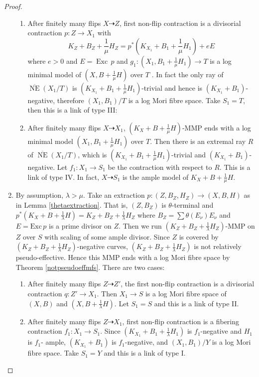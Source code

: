 \documentclass[11pt]{amsart}
\begin{document}
\begin{proof}
\begin{enumerate}
\begin{enumerate}
    \item \label{a3}
      After finitely many flips $ X\dashrightarrow Z $, first non-flip contraction is a divisorial contraction $ p:Z\to X_1$ with 
    \[ K_Z+B_Z+\frac{1}{\mu}H_Z=p^*(K_{X_1}+B_1+\frac{1}{\mu}H_1)+eE \]
    where $ e>0 $ and  $E=\operatorname{Exc}\,p$ and  $g_{1}: (X_1,B_1+\frac{1}{\mu}H_1) \to T$ is a log minimal model of $(X,B+\frac{1}{\mu}H)$ over $T$ . In fact the only ray of $ \overline{\operatorname{NE}}(X_1/T) $ is $ (K_{X_1}+B_1+\frac{1}{\mu}H_1) $-trivial and hence is $ (K_{X_1}+B_1) $-negative, therefore $ (X_1,B_1)/T $ is a log Mori fibre space. Take $ S_1=T $, then this is a link of type III:
  \item \label{a4}After finitely many flips $ X\dashrightarrow X_1 $, $(K_{X}+B+\frac{1}{\mu}H)$-MMP ends with a log minimal model $ (X_1,B_1+\frac{1}{\mu}H_1) $ over $T $. Then there is an extremal ray $R$ of $ \overline{\operatorname{NE}}(X_1/T) $, which is $ (K_{X_1}+B_1+\frac{1}{\mu}H_1) $-trivial and $ (K_{X_1}+B_1) $-negative. Let $ f_1:X_1\to S_1 $ be the contraction with respect to $R$. This is a link of type IV. In fact, $X \dashrightarrow  S_{1}$ is the ample model of $K_{X}+B+\frac{1}{\mu}H$.
  \end{enumerate}
\item\label{b}By assumption, $\lambda>\mu$. Take  an extraction $ p:(Z,B_Z,H_Z)\to (X,B,H) $ as in Lemma \ref{thetaextraction}. That is,  $ (Z,B_Z) $ is $ \theta $-terminal and $ p^*(K_X+B+\frac{1}{\lambda}H)=K_Z+B_Z+\frac{1}{\lambda}H_Z $ where $ B_Z=\sum\theta(E_\nu)E_\nu $ and $ E=\mathrm{Exc}\,p $ is a prime divisor on $ Z $.
  Then we run $ (K_Z+B_Z+\frac{1}{\lambda}H_Z) $-MMP on $ Z $ over $ S $ with scaling of some ample divisor. Since $Z$ is covered by $ (K_Z+B_Z+\frac{1}{\lambda}H_Z) $-negative curves, $ (K_Z+B_Z+\frac{1}{\lambda}H_Z) $ is not relatively pseudo-effective. Hence this MMP ends with a log Mori fibre space by Theorem \ref{notpseudoeffmfs}. There are two cases:
  \begin{enumerate}
    \item \label{b1}After finitely many flips $ Z\dashrightarrow Z' $, the first non-flip contraction is a divisorial contraction $ q:Z'\to X_1 $. Then $ X_{1}\to S $ is a log Mori fibre space of $(X,B)$ and $(X,B+\frac{1}{\lambda}H)$.  Let $ S_1=S $ and this is a link of type II.
    \item\label{b2}After finitely many flips $ Z\dashrightarrow X_1 $, first non-flip contraction is a fibering contraction $ f_1:X_1\to S_{1}$. Since $ (K_{X_1}+B_1+\frac{1}{\lambda}H_1) $ is $ f_1 $-negative and $ H_1 $ is $ f_1 $- ample, $ (K_{X_1}+B_1) $ is $ f_1 $-negative, and $ (X_1,B_1)/Y $ is a log Mori fibre space.  Take $ S_1=Y $ and this is a link of type I.
  \end{enumerate} 
\end{enumerate}
\end{proof}
\end{document}
